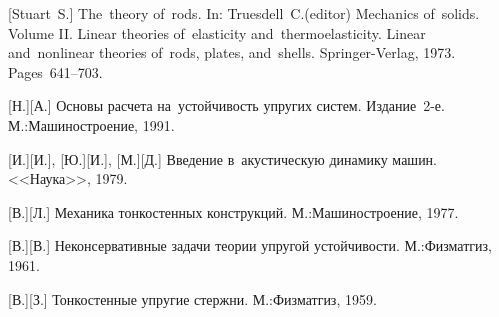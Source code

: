 \vspace*{10mm}


\newcommand\mirpublisher{<<Мир>>} %
\newcommand\naukapublisher{<<Наука>>} %
\newcommand\maschinenbaumoskauerverlag{М.:\;Машино\-строение}
\newcommand\maschinenbauleningraderverlag{Л.:\;Машино\-строение}
\newcommand\fizmatgiz{М.:\;Физ\-мат\-гиз} %

\begin{thebibliography}{123}
\small

\thispagestyle{empty}


\begin{otherlanguage}{russian}

[Stuart~S.] The~theory of~rods. In: Truesdell~C.\:(editor) Mechanics of~solids. Volume II. Linear theories of~elasticity and~thermoelasticity. Linear and~nonlinear theories of~rods, plates, and~shells. Springer\hbox{-}Verlag, 1973. Pages~641\hbox{--}703.

[Н.][А.] Основы расчета на~устойчивость упругих систем. Издание~2\hbox{-}е. \maschinenbaumoskauerverlag, 1991. 

[И.][И.], [Ю.][И.], [М.][Д.] Введение в~акустическую динамику машин. \naukapublisher, 1979. 

[В.][Л.] Механика тонкостенных конструкций. \maschinenbaumoskauerverlag, 1977. 

[В.][В.] Неконсервативные задачи теории упругой устойчивости. \fizmatgiz, 1961. 

[В.][З.] Тонкостенные упругие стержни. \fizmatgiz, 1959. 


\end{otherlanguage}
\end{thebibliography}
